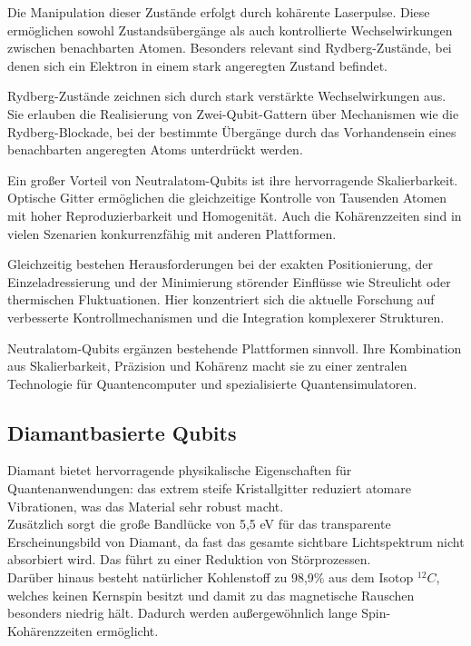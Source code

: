 Die Manipulation dieser Zustände erfolgt durch kohärente Laserpulse. Diese ermöglichen sowohl Zustandsübergänge als auch kontrollierte Wechselwirkungen zwischen benachbarten Atomen. Besonders relevant sind Rydberg-Zustände, bei denen sich ein Elektron in einem stark angeregten Zustand befindet.

Rydberg-Zustände zeichnen sich durch stark verstärkte Wechselwirkungen aus. Sie erlauben die Realisierung von Zwei-Qubit-Gattern über Mechanismen wie die Rydberg-Blockade, bei der bestimmte Übergänge durch das Vorhandensein eines benachbarten angeregten Atoms unterdrückt werden.

Ein großer Vorteil von Neutralatom-Qubits ist ihre hervorragende Skalierbarkeit. Optische Gitter ermöglichen die gleichzeitige Kontrolle von Tausenden Atomen mit hoher Reproduzierbarkeit und Homogenität. Auch die Kohärenzzeiten sind in vielen Szenarien konkurrenzfähig mit anderen Plattformen.

Gleichzeitig bestehen Herausforderungen bei der exakten Positionierung, der Einzeladressierung und der Minimierung störender Einflüsse wie Streulicht oder thermischen Fluktuationen. Hier konzentriert sich die aktuelle Forschung auf verbesserte Kontrollmechanismen und die Integration komplexerer Strukturen.

Neutralatom-Qubits ergänzen bestehende Plattformen sinnvoll. Ihre Kombination aus Skalierbarkeit, Präzision und Kohärenz macht sie zu einer zentralen Technologie für Quantencomputer und spezialisierte Quantensimulatoren.





\subsection{Diamantbasierte Qubits}

Diamant bietet hervorragende physikalische Eigenschaften für Quantenanwendungen: das extrem steife Kristallgitter reduziert atomare Vibrationen, was das Material sehr robust macht. \\
Zusätzlich sorgt die große Bandlücke von 5,5 eV für das transparente Erscheinungsbild von Diamant, da fast das gesamte sichtbare Lichtspektrum nicht absorbiert wird. Das führt zu einer Reduktion von Störprozessen. \\
Darüber hinaus besteht natürlicher Kohlenstoff zu 98,9\% aus dem Isotop ${}^{12}C$, welches keinen Kernspin besitzt und damit zu das magnetische Rauschen besonders niedrig hält. Dadurch werden außergewöhnlich lange Spin-Kohärenzzeiten ermöglicht. 




